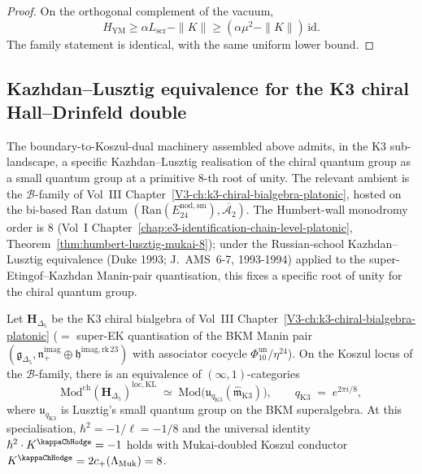 \begin{proof}
On the orthogonal complement of the vacuum,
\[
H_{\mathrm{YM}}\ge \alpha L_{\mathrm{scr}}-\|K\| \ge (\alpha\mu^2-\|K\|)\,\mathrm{id}.
\]
The family statement is identical, with the same uniform lower bound.
\end{proof}

\subsection{Kazhdan--Lusztig equivalence for the K3 chiral
Hall--Drinfeld double}
\label{subsec:kl-k3-chiral-hd-double}

The boundary-to-Koszul-dual machinery assembled above admits, in the
K3 sub-landscape, a specific Kazhdan--Lusztig realisation of the
chiral quantum group as a small quantum group at a primitive $8$-th
root of unity. The relevant ambient is the $\mathcal{B}$-family of
Vol~III Chapter~\ref{V3-ch:k3-chiral-bialgebra-platonic}, hosted on the
bi-based Ran datum $(\mathrm{Ran}(E^{\mathrm{nod,sm}}_{24}),
\overline{\mathcal{A}_2})$. The Humbert-wall monodromy order is $8$
(Vol~I Chapter~\ref{chap:e3-identification-chain-level-platonic},
Theorem~\ref{thm:humbert-lusztig-mukai-8}); under the Russian-school
Kazhdan--Lusztig equivalence (Duke 1993; J.~AMS~6-7, 1993-1994) applied
to the super-Etingof--Kazhdan Manin-pair quantisation, this fixes a
specific root of unity for the chiral quantum group.

\begin{theorem}
\label{thm:kl-k3-bkm-zeta8}
Let $\mathbf{H}_{\Delta_5}$ be the K3 chiral bialgebra of Vol~III
Chapter~\ref{V3-ch:k3-chiral-bialgebra-platonic}
($=$ super-EK quantisation of the BKM Manin pair
$(\mathfrak{g}_{\Delta_5}, \mathfrak{n}_+^{\mathrm{imag}}\oplus
	\mathfrak{h}^{\mathrm{imag,rk\,23}})$ with associator cocycle
	$\Phi_{10}^{\mathrm{un}}/\eta^{24}$). On the Koszul locus of the
$\mathcal{B}$-family, there is an equivalence of
$(\infty,1)$-categories
\[
 \mathrm{Mod}^{\mathrm{ch}}(\mathbf{H}_{\Delta_5})^{\mathrm{loc,KL}}
 \;\simeq\;
 \mathrm{Mod}\bigl(\mathfrak{u}_{q_{\mathrm{K3}}}
 (\widehat{\mathfrak{m}}_{\mathrm{K3}})\bigr),
 \qquad
 q_{\mathrm{K3}} \;=\; e^{2\pi i/8},
\]
where $\mathfrak{u}_{q_{\mathrm{K3}}}$ is Lusztig's small quantum
group on the BKM superalgebra. At this specialisation, $\hbar^2 =
-1/\ell = -1/8$ and the universal identity $\hbar^2 \cdot
K^{\kappaChHodge} = -1$ holds with Mukai-doubled Koszul
conductor $K^{\kappaChHodge} = 2 c_+(\Lambda_{\mathrm{Muk}}) =
8$.
\end{theorem}

